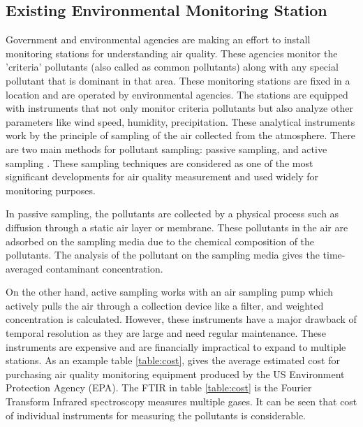  
 \subsection{Existing Environmental Monitoring Station}
 
 Government and environmental agencies are making an effort to install monitoring stations for understanding air quality. These agencies monitor the 'criteria' pollutants (also called as common pollutants) along with any special pollutant that is dominant in that area. These monitoring stations are fixed in a location and are operated by environmental agencies. The stations are equipped with instruments that not only monitor criteria pollutants but also analyze other parameters like wind speed, humidity, precipitation. These analytical instruments work by the principle of sampling of the air collected from the atmosphere.
 There are two main methods for pollutant sampling: passive sampling, and active sampling \cite{Balakrishnan2015}. These sampling techniques are considered as one of the most significant developments for air quality measurement and used widely for monitoring purposes. 
 
 \par
 
 In passive sampling, the pollutants are collected by a physical process such as diffusion through a static air layer or membrane. These pollutants in the air are adsorbed on the sampling media due to the chemical composition of the pollutants. The analysis of the pollutant on the sampling media gives the time-averaged contaminant concentration. %
 
 On the other hand, active sampling works with an air sampling pump which actively pulls the air through a collection device like a filter, and weighted concentration is calculated. However, these instruments have a major drawback of temporal resolution as they are large and need regular maintenance. These instruments are expensive and are financially impractical to expand to multiple stations. As an example table \ref{table:cost}, gives the average estimated cost for purchasing air quality monitoring equipment produced by the US Environment Protection Agency (EPA). The FTIR in table \ref{table:cost} is the Fourier Transform Infrared spectroscopy measures multiple gases. It can be seen that cost of individual instruments for measuring the pollutants is considerable. 

 \hspace{1 cm}
 
